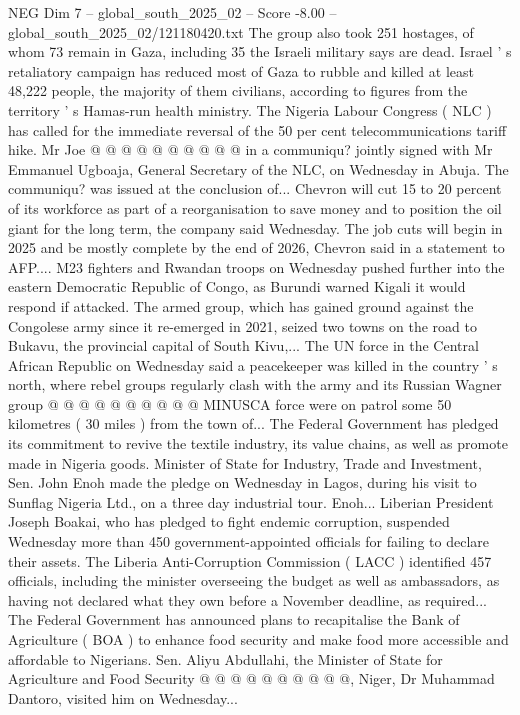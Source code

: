 \begin{textsample}{NEG Dim 7 – global\_south\_2025\_02 – Score -8.00 – global\_south\_2025\_02/121180420.txt}
The group also took 251 hostages, of whom 73 remain in Gaza, including 35 the Israeli military says are dead.
Israel ' s retaliatory campaign has reduced most of Gaza to rubble and killed at least 48,222 people, the majority of them civilians, according to figures from the territory ' s Hamas-run health ministry.
The Nigeria Labour Congress ( NLC ) has called for the immediate reversal of the 50 per cent telecommunications tariff hike.
Mr Joe @ @ @ @ @ @ @ @ @ @ in a communiqu? jointly signed with Mr Emmanuel Ugboaja, General Secretary of the NLC, on Wednesday in Abuja.
The communiqu? was issued at the conclusion of...
Chevron will cut 15 to 20 percent of its workforce as part of a reorganisation to save money and to position the oil giant for the long term, the company said Wednesday.
The job cuts will begin in 2025 and be mostly complete by the end of 2026, Chevron said in a statement to AFP....
M23 fighters and Rwandan troops on Wednesday pushed further into the eastern Democratic Republic of Congo, as Burundi warned Kigali it would respond if attacked.
The armed group, which has gained ground against the Congolese army since it re-emerged in 2021, seized two towns on the road to Bukavu, the provincial capital of South Kivu,...
The UN force in the Central African Republic on Wednesday said a peacekeeper was killed in the country ' s north, where rebel groups regularly clash with the army and its Russian Wagner group @ @ @ @ @ @ @ @ @ @ MINUSCA force were on patrol some 50 kilometres ( 30 miles ) from the town of...
The Federal Government has pledged its commitment to revive the textile industry, its value chains, as well as promote made in Nigeria goods.
Minister of State for Industry, Trade and Investment, Sen.
John Enoh made the pledge on Wednesday in Lagos, during his visit to Sunflag Nigeria Ltd., on a three day industrial tour.
Enoh...
Liberian President Joseph Boakai, who has pledged to fight endemic corruption, suspended Wednesday more than 450 government-appointed officials for failing to declare their assets.
The Liberia Anti-Corruption Commission ( LACC ) identified 457 officials, including the minister overseeing the budget as well as ambassadors, as having not declared what they own before a November deadline, as required...
The Federal Government has announced plans to recapitalise the Bank of Agriculture ( BOA ) to enhance food security and make food more accessible and affordable to Nigerians.
Sen.
Aliyu Abdullahi, the Minister of State for Agriculture and Food Security @ @ @ @ @ @ @ @ @ @, Niger, Dr Muhammad Dantoro, visited him on Wednesday...

\end{textsample}
